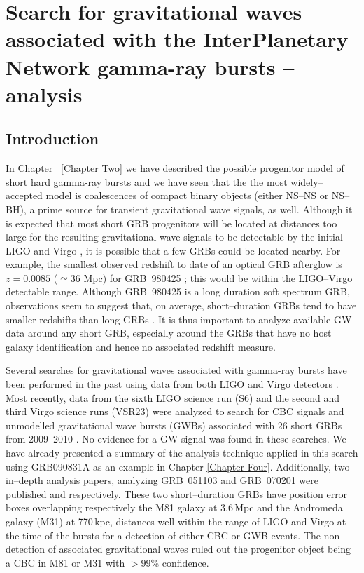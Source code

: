 \chapter{Search for gravitational waves associated with the InterPlanetary Network gamma-ray bursts -- analysis} %
\label{Chapter Seven}

\section{Introduction} 
\label{sec:intro} 

In Chapter ~\ref{Chapter Two} we have described the possible progenitor model of short hard gamma-ray bursts and we have seen that the the most widely--accepted model is coalescences of compact binary objects (either NS--NS or NS--BH), a prime source for transient gravitational wave signals, as well. Although it is expected that most short GRB progenitors will be located at distances too large for the resulting gravitational wave signals to be detectable by the initial LIGO and Virgo \citep{berger05}, it is possible that a few GRBs could be located nearby. For example, the smallest observed redshift to date of an optical GRB afterglow is $z=0.0085$ ($\simeq36$ Mpc) for GRB~980425 \cite{kulkarni98,galama98,iwamoto98}; this would be within the LIGO--Virgo detectable range. Although GRB~980425 is a long duration soft spectrum GRB, observations seem to suggest that, on average, short--duration GRBs tend to have smaller redshifts than long GRBs \cite{GuPi:05,fox05}. It is thus important to analyze available \ac{GW} data around any short GRB, especially around the GRBs that have no host galaxy identification and hence no associated redshift measure.

Several searches for gravitational waves associated with gamma-ray bursts have been performed in the past using data from both LIGO and Virgo detectors \cite{abbottgrb05,burstGrbS234,Ac_etal:07,Ac_etal:08}. Most recently, data from the sixth LIGO science run (S6) and the second and third Virgo science runs (VSR23) were analyzed to search for \ac{CBC} signals and unmodelled gravitational wave bursts (GWBs) associated with 26 short GRBs from 2009--2010 \cite{lvc:s6grb}. No evidence for a \ac{GW} signal was found in these searches. We have already presented a summary of the analysis technique applied in this search using GRB090831A as an example in Chapter \ref{Chapter Four}. Additionally, two in--depth analysis papers, analyzing GRB~051103 and GRB~070201 were published \cite{Abadie:2012bz} and \cite{Abbott:2007rh} respectively. These two short--duration GRBs have position error boxes overlapping respectively the M81 galaxy at 3.6\,Mpc and the Andromeda galaxy (M31) at 770\,kpc, distances well within the range of LIGO and Virgo at the time of the bursts for a detection of either \ac{CBC} or GWB events. The non--detection of associated gravitational waves ruled out the progenitor object being a CBC in M81 or M31 with $>$99\% confidence.

